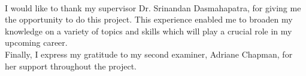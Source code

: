 

\begin{acknowledgements}
\\
I would like to thank my supervisor Dr. Srinandan Dasmahapatra, for giving me the opportunity to do this project. This experience enabled me to broaden my knowledge on a variety of topics and skills which will play a crucial role in my upcoming career. \\

Finally, I express my gratitude to my second examiner, Adriane Chapman, for her support throughout the project. 

\end{acknowledgements}
